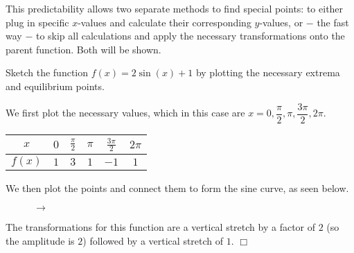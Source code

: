 \documentclass[lang=en,11pt]{elegantbook}
\begin{document}
This predictability allows two separate methods to find special points: to either plug in specific $x$-values and calculate their corresponding $y$-values, or $-$ the fast way $-$ to skip all calculations and apply the necessary transformations onto the parent function. Both will be shown.
\begin{example}
Sketch the function $f(x)=2\sin(x)+1$ by plotting the necessary extrema and equilibrium points.
\end{example}
\begin{solution}
We first plot the necessary values, which in this case are $x=0,\dfrac{\pi}{2},\pi,\dfrac{3\pi}{2},2\pi$.
\begin{table}[!h]
    \centering
    \begin{tabular}{|c||c|c|c|c|c|}
        \toprule
        $x$ & $0$ & $\frac{\pi}{2}$ & $\pi$ & $\frac{3\pi}{2}$ & $2\pi$ \\
        \midrule
        $f(x)$ & $1$ & $3$ & $1$ & $-1$ & $1$ \\
        \bottomrule
    \end{tabular}
\end{table}

We then plot the points and connect them to form the sine curve, as seen below.
\begin{figure}[!h]
    \centering
     $\to$ 
\end{figure}

The transformations for this function are a vertical stretch by a factor of $2$ (so the amplitude is $2$) followed by a vertical stretch of $1$. $\Box$
\end{solution}
\end{document}
